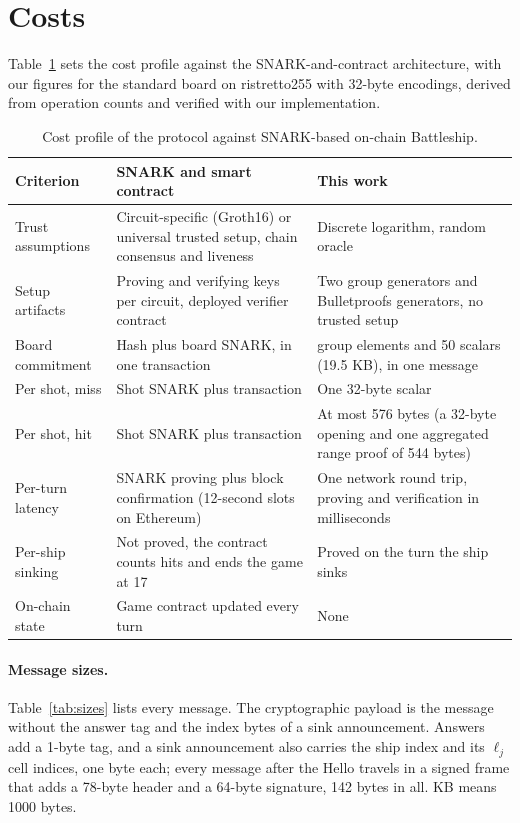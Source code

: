 \documentclass[11pt]{article}
\theoremstyle{definition}
\theoremstyle{remark}
\begin{document}
\section{Costs}\label{sec:costs}
Table~\ref{tab:profile} sets the cost profile against the SNARK-and-contract architecture, with our figures for the standard board on ristretto255 with 32-byte encodings, derived from operation counts and verified with our implementation.

\begin{table}[t]
\centering
\small
\begin{tabular}{@{}>{\raggedright\arraybackslash}p{2.6cm}>{\raggedright\arraybackslash}p{6.0cm}>{\raggedright\arraybackslash}p{6.0cm}@{}}
\toprule
Criterion & SNARK and smart contract & This work\\
\midrule
Trust assumptions & Circuit-specific (Groth16) or universal trusted setup, chain consensus and liveness & Discrete logarithm, random oracle\\
Setup artifacts & Proving and verifying keys per circuit, deployed verifier contract & Two group generators and Bulletproofs generators, no trusted setup\\
Board commitment & Hash plus board SNARK, in one transaction & 559 group elements and 50 scalars (19.5 KB), in one message\\
Per shot, miss & Shot SNARK plus transaction & One 32-byte scalar\\
Per shot, hit & Shot SNARK plus transaction & At most 576 bytes (a 32-byte opening and one aggregated range proof of 544 bytes)\\
Per-turn latency & SNARK proving plus block confirmation (12-second slots on Ethereum) & One network round trip, proving and verification in milliseconds\\
Per-ship sinking & Not proved, the contract counts hits and ends the game at 17 & Proved on the turn the ship sinks\\
On-chain state & Game contract updated every turn & None\\
\bottomrule
\end{tabular}
\caption{Cost profile of the protocol against SNARK-based on-chain Battleship.}
\label{tab:profile}
\end{table}

\paragraph{Message sizes.}
Table~\ref{tab:sizes} lists every message. The cryptographic payload is the message without the answer tag and the index bytes of a sink announcement. Answers add a 1-byte tag, and a sink announcement also carries the ship index and its $\ell_j$ cell indices, one byte each; every message after the Hello travels in a signed frame that adds a 78-byte header and a 64-byte signature, 142 bytes in all. KB means 1000 bytes.
\end{document}
